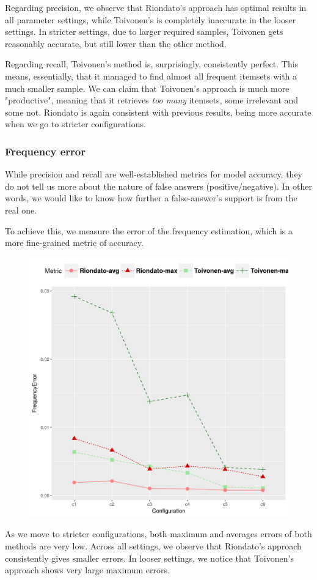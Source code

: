 \documentclass[11pt]{sigplanconf}
\begin{document}
Regarding precision, we observe that Riondato's approach has optimal results in all parameter settings, while Toivonen's is completely inaccurate in the looser settings. In stricter settings, due to larger required samples, Toivonen gets reasonably accurate, but still lower than the other method.

Regarding recall, Toivonen's method is, surprisingly, consistently perfect. This means, essentially, that it managed to find almost all frequent itemsets with a much smaller sample. We can claim that Toivonen's approach is much more "productive", meaning that it retrieves \textit{too many} itemsets, some irrelevant and some not. Riondato is again consistent with previous results, being more accurate when we go to stricter configurations.

\subsubsection{Frequency error}
While precision and recall are well-established metrics for model accuracy, they do not tell us more about the nature of false answers (positive/negative). In other words, we would like to know how further a false-answer's support is from the real one.

To achieve this, we measure the error of the frequency estimation, which is a more fine-grained metric of accuracy.
\begin{figure}[h!]
\centering
\includegraphics[width=.7\columnwidth]{T40I10D100K.dat/freq.png}
\end{figure}

As we move to stricter configurations, both maximum and averages errors of both methods are very low. Across all settings, we observe that Riondato's approach consistently gives smaller errors. In looser settings, we notice that Toivonen's approach shows very large maximum errors.
\end{document}
